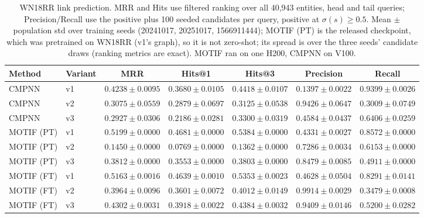 \documentclass{article}
\begin{document}
\begin{table}[t]
\centering
\small
\begin{tabular}{||l||l||c|c|c||c|c||}
\hline
\textbf{Method} & \textbf{Variant} & \textbf{MRR} & \textbf{Hits@1} & \textbf{Hits@3} & \textbf{Precision} & \textbf{Recall} \\
\hline\hline
CMPNN & v1 & $0.4238 \pm 0.0095$ & $0.3680 \pm 0.0105$ & $0.4418 \pm 0.0107$ & $0.1397 \pm 0.0022$ & $0.9399 \pm 0.0026$ \\
\hline
CMPNN & v2 & $0.3075 \pm 0.0559$ & $0.2879 \pm 0.0697$ & $0.3125 \pm 0.0538$ & $0.9426 \pm 0.0647$ & $0.3009 \pm 0.0749$ \\
\hline
CMPNN & v3 & $0.2927 \pm 0.0306$ & $0.2186 \pm 0.0281$ & $0.3300 \pm 0.0319$ & $0.4584 \pm 0.0437$ & $0.6406 \pm 0.0259$ \\
\hline
\hline
MOTIF (PT) & v1 & $0.5199 \pm 0.0000$ & $0.4681 \pm 0.0000$ & $0.5384 \pm 0.0000$ & $0.4331 \pm 0.0027$ & $0.8572 \pm 0.0000$ \\
\hline
MOTIF (PT) & v2 & $0.1450 \pm 0.0000$ & $0.0769 \pm 0.0000$ & $0.1362 \pm 0.0000$ & $0.7286 \pm 0.0034$ & $0.6153 \pm 0.0000$ \\
\hline
MOTIF (PT) & v3 & $0.3812 \pm 0.0000$ & $0.3553 \pm 0.0000$ & $0.3803 \pm 0.0000$ & $0.8479 \pm 0.0085$ & $0.4911 \pm 0.0000$ \\
\hline
\hline
MOTIF (FT) & v1 & $0.5163 \pm 0.0016$ & $0.4639 \pm 0.0010$ & $0.5353 \pm 0.0023$ & $0.4628 \pm 0.0504$ & $0.8291 \pm 0.0141$ \\
\hline
MOTIF (FT) & v2 & $0.3964 \pm 0.0096$ & $0.3601 \pm 0.0072$ & $0.4012 \pm 0.0149$ & $0.9914 \pm 0.0029$ & $0.3479 \pm 0.0008$ \\
\hline
MOTIF (FT) & v3 & $0.4302 \pm 0.0031$ & $0.3918 \pm 0.0022$ & $0.4384 \pm 0.0032$ & $0.9409 \pm 0.0146$ & $0.5200 \pm 0.0282$ \\
\hline
\end{tabular}
\caption{WN18RR link prediction. MRR and Hits use filtered ranking over all 40,943 entities, head and tail queries; Precision/Recall use the positive plus 100 seeded candidates per query, positive at $\sigma(s) \geq 0.5$. Mean $\pm$ population std over training seeds (20241017, 20251017, 1566911444); MOTIF (PT) is the released checkpoint, which was pretrained on WN18RR (v1's graph), so it is not zero-shot; its spread is over the three seeds' candidate draws (ranking metrics are exact). MOTIF ran on one H200, CMPNN on V100. }
\label{tab:wordnet_link_prediction_seed_performance}
\end{table}
\end{document}
